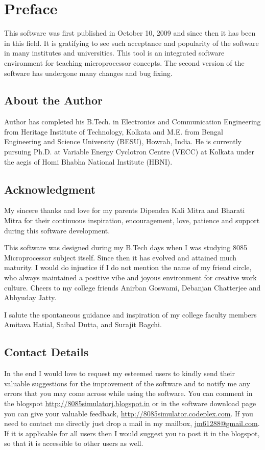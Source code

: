 \chapter*{Preface}
This software was first published in October 10, 2009 and since then it has been in this field. It is gratifying to see such acceptance and popularity of the software in many institutes and universities. This tool is an integrated software environment for teaching microprocessor concepts.
The second version of the software has undergone many changes and bug fixing. 


\section*{About the Author} 

Author has completed his B.Tech. in Electronics and Communication Engineering from Heritage Institute of Technology, Kolkata and M.E. from Bengal Engineering and Science University (BESU), Howrah, India. He is currently pursuing Ph.D. at Variable Energy Cyclotron Centre (VECC) at Kolkata under the aegis of Homi Bhabha National Institute (HBNI).

\section*{Acknowledgment}
My sincere thanks and love for my parents Dipendra Kali Mitra and Bharati Mitra for their continuous inspiration, encouragement, love, patience and support during this software development. 

This software was designed during my B.Tech days when I was studying 8085 Microprocessor subject itself. Since then it has evolved and attained much maturity. I would do injustice if I do not mention the name of my friend circle, who always maintained a positive vibe and joyous environment for creative work culture. Cheers to my college friends Anirban Goswami, Debanjan Chatterjee and Abhyuday Jatty.

I salute the spontaneous guidance and inspiration of my college faculty members Amitava Hatial, Saibal Dutta, and Surajit Bagchi.
 

\section*{Contact Details}
In the end I would love to request my esteemed  users to kindly send their valuable suggestions for the improvement of the software and to notify me any errors that you may come across while using the software. You can comment in the blogspot \url{http://8085simulatorj.blogspot.in} or in the software download page you can give your valuable feedback, \url{http://8085simulator.codeplex.com}. If you need to contact me directly 																																																																																																																																	just drop a mail in my mailbox, \url{jm61288@gmail.com}. If it is applicable for all users then I would suggest you to post it in the blogspot, so that it is accessible to other users as well. 

{
\vspace{0.1\linewidth}
\raggedleft
{}\\
}